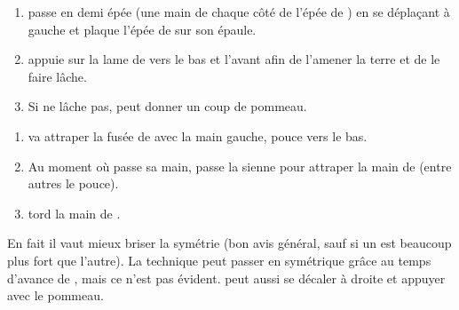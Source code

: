 \begin{technique}

\begin{enumerate}
	\item \A passe en demi épée (une main de chaque côté de l'épée de \D) en se déplaçant à gauche et plaque l'épée de \D sur son épaule.
	\item \A appuie sur la lame de \D vers le bas et l'avant afin de l'amener la terre et de le faire lâche.
	\item Si \D ne lâche pas, \A peut donner un coup de pommeau.
\end{enumerate}
\end{technique}


\begin{technique}

\begin{enumerate}
	\item \A va attraper la fusée de \D avec la main gauche, pouce vers le bas.
	\item Au moment où \A passe sa main, \D passe la sienne pour attraper la main de \A (entre autres le pouce).
	\item \D tord la main de \A.
\end{enumerate}

En fait il vaut mieux briser la symétrie (bon avis général, sauf si un est beaucoup plus fort que l'autre).
La technique peut passer en symétrique grâce au temps d'avance de \D, mais ce n'est pas évident.
\D peut aussi se décaler à droite et appuyer avec le pommeau.
\end{technique}

